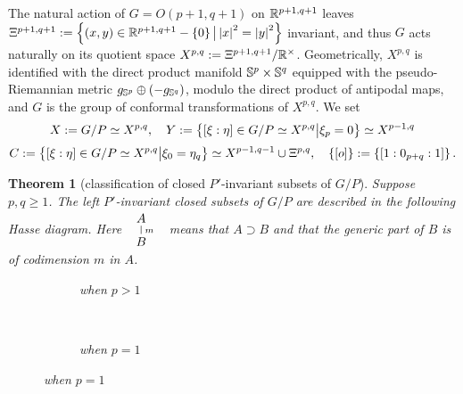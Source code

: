 \documentclass[12pt]{article} %
\newtheorem{theorem}{Theorem}
\theoremstyle{definition}
\theoremstyle{exampstyle} \newtheorem{examp}[theorem]{Theorem}
\renewcommand{\setminus}{-}
\begin{document}
The natural action of $G=O(p+1,q+1)$ on $\mathbb{R}^{p+1,q+1}$ leaves
$\Xi^{p+1,q+1}:=\mysetn{(x,y)\in\R^{p+1,q+1}\setminus\left\{ 0 \right\}}{\myabs{x}^2=\myabs{y}^2}$ invariant, and thus $G$ acts naturally on its quotient space
$X^{p,q}:=\Xi^{p+1,q+1}/\mathbb{R}^{\times}$. 
Geometrically, $X^{p,q}$ is identified with the direct product manifold $\mathbb{S}^p\times\mathbb{S}^q$ equipped with the pseudo-Riemannian metric $g_{\mathbb{S}^p}\oplus \left( -g_{\mathbb{S}^q} \right)$,
modulo the direct product of antipodal maps, and $G$ is the group of conformal transformations of $X^{p,q}$.
We set
\[
	X:=G/P\simeq X^{p,q},\quad Y:=\left\{[\xi:\eta]\in G/P\simeq X^{p,q}\big| \xi_{p}=0\right\}\simeq X^{p-1,q}\]
	\[C:=\left\{[\xi:\eta]\in G/P\simeq X^{p,q}\big| \xi_{0}=\eta_q\right\}\simeq X^{p-1,q-1}\cup\Xi^{p,q},\quad\left\{ [o] \right\}:=\left\{ [1:0_{p+q}:1] \right\}.\]
\begin{theorem}[classification of closed $P'$-invariant subsets of $G/P$]
	Suppose $p,q\ge1$.
	The left $P'$-invariant closed subsets of $G/P$ are described in the following Hasse diagram. Here 
	$
	\begin{array}{l}
	        \xymatrixrowsep{0.5pc}
		\xymatrix{A\ar@{-}[d]^m\\B}
	\end{array}
	$
	means that $A\supset B$ and that the generic part of $B$ is of codimension $m$ in $A$.\\
  \begin{figure}[H]
    \centering
    \begin{subfigure}[t]{0.3\textwidth}
	    \xymatrixrowsep{0.5pc}
	\caption{when $p>1$}
    \end{subfigure}
    ~ %
    \begin{subfigure}[t]{0.3\textwidth}
	    \xymatrixrowsep{0.5pc}
	    {}
	\caption{when $p=1$}
    \end{subfigure}
\end{figure}
\end{theorem}
\end{document}
